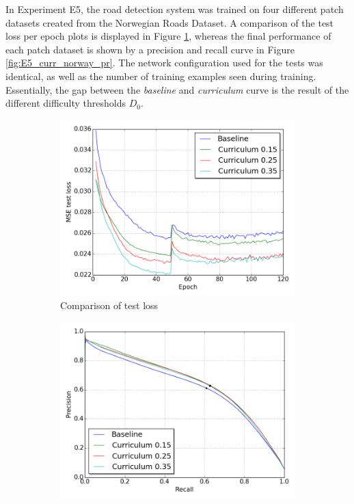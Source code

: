 In Experiment E5, the road detection system was trained on four different patch datasets created from the Norwegian Roads Dataset. A comparison of the test loss per epoch plots is displayed in Figure \ref{fig:E5_curr_norway_loss}, whereas the final performance of each patch dataset is shown by a precision and recall curve in Figure \ref{fig:E5_curr_norway_pr}. The network configuration used for the tests was identical, as well as the number of training examples seen during training. Essentially, the gap between the \textit{baseline} and \textit{curriculum} curve is the result of the different difficulty thresholds $D_0$.\\

\begin{figure}[h]
\begin{subfigure}{0.5\textwidth}
\includegraphics[width=\linewidth]{figs/E5/E5-lc.png}
\caption{Comparison of test loss} \label{fig:E5_curr_norway_loss}
\end{subfigure}
\hspace*{\fill} %
\begin{subfigure}{0.5\textwidth}
\includegraphics[width=\linewidth]{figs/E5/E5-pr.png}

\end{subfigure}
\end{figure}
